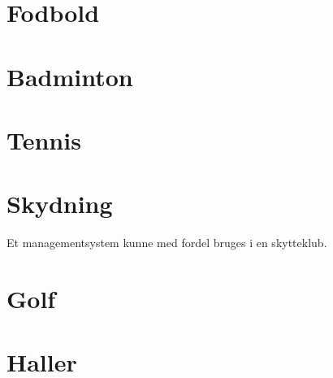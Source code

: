 \section{Fodbold}



\section{Badminton}

\section{Tennis}

\section{Skydning}
Et managementsystem kunne med fordel bruges i en skytteklub. 

\section{Golf}

\section{Haller}
